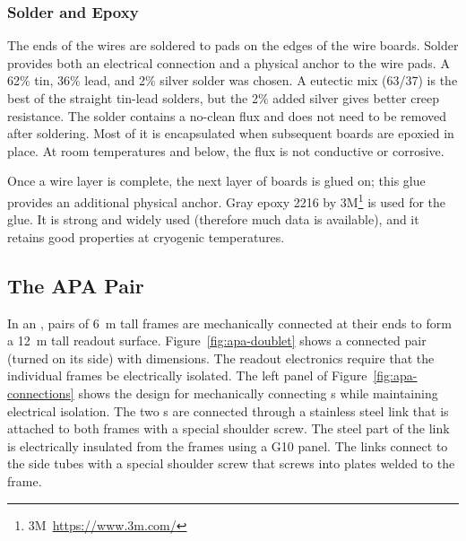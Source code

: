 \subsubsection{Solder and Epoxy}
\label{sec:glue-solder}

The ends of the wires are soldered to pads on the edges of the wire boards.  Solder provides both an electrical connection and a physical anchor to the wire pads. A 62$\%$ tin, 36$\%$ lead, and 2$\%$ silver solder was chosen.  A eutectic mix (63/37) is the best of the straight tin-lead solders, but the 2$\%$ added silver gives better creep resistance.  The solder contains a no-clean flux and does not need to be removed after soldering. Most of it is encapsulated when subsequent boards are epoxied in place.  At room temperatures and below, the flux is not conductive or corrosive.

Once a wire layer is complete, the next layer of boards is glued on; this glue provides an additional physical anchor. Gray epoxy \num{2216} by 3M\footnote{3M\texttrademark ~\url{https://www.3m.com/}} is used for the glue.  It is strong and widely used (therefore much data is available), and it retains good properties at cryogenic temperatures.  



\subsection{The APA Pair} %
\label{sec:fdsp-apa-intfc-apa}


In an , pairs of \SI{6}{m} tall  frames are mechanically connected at their ends to form a \SI{12}{m} tall readout surface.  Figure~\ref{fig:apa-doublet} shows a connected pair (turned on its side) with dimensions.  The  readout electronics require that the individual  frames be electrically isolated.   The left panel of Figure~\ref{fig:apa-connections} shows the design for mechanically connecting s while maintaining electrical isolation.  The two s are connected through a stainless steel link that is attached to both frames with a special shoulder screw.  The steel part of the link is electrically insulated from the frames using a G10 panel.  The links connect to the side tubes with a special shoulder screw that screws into plates welded to the frame.  

